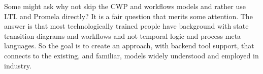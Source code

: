 Some might ask why not skip the CWP and workflows models and rather use LTL and Promela directly? It is a fair question that merits some attention. The answer is that most technologically trained people have background with state transition diagrams and workflows and not temporal logic and process meta languages. So the goal is to create an approach, with backend tool support, that connects to the existing, and familiar, models widely understood and employed in industry. 